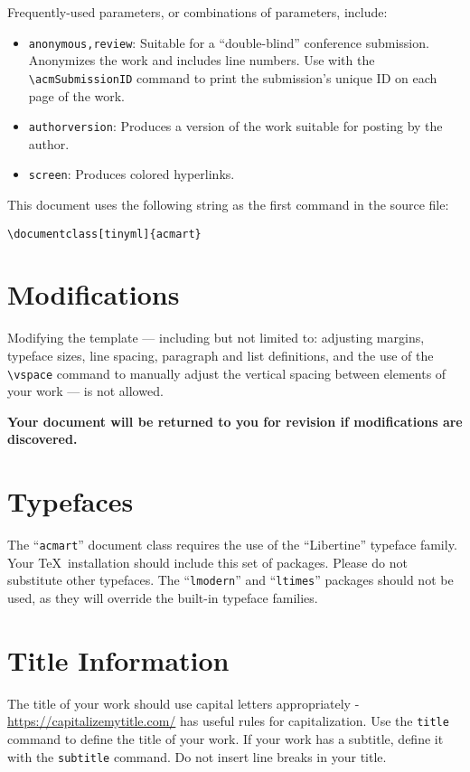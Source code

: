 \documentclass[tinyml]{acmart}
\begin{document}
Frequently-used parameters, or combinations of parameters, include:
\begin{itemize}
\item {\verb|anonymous,review|}: Suitable for a ``double-blind''
  conference submission. Anonymizes the work and includes line
  numbers. Use with the \verb|\acmSubmissionID| command to print the
  submission's unique ID on each page of the work.
\item{\verb|authorversion|}: Produces a version of the work suitable
  for posting by the author.
\item{\verb|screen|}: Produces colored hyperlinks.
\end{itemize}

This document uses the following string as the first command in the
source file:
\begin{verbatim}
\documentclass[tinyml]{acmart}
\end{verbatim}

\section{Modifications}

Modifying the template --- including but not limited to: adjusting
margins, typeface sizes, line spacing, paragraph and list definitions,
and the use of the \verb|\vspace| command to manually adjust the
vertical spacing between elements of your work --- is not allowed.

{\bfseries Your document will be returned to you for revision if
  modifications are discovered.}

\section{Typefaces}

The ``\verb|acmart|'' document class requires the use of the
``Libertine'' typeface family. Your \TeX\ installation should include
this set of packages. Please do not substitute other typefaces. The
``\verb|lmodern|'' and ``\verb|ltimes|'' packages should not be used,
as they will override the built-in typeface families.

\section{Title Information}

The title of your work should use capital letters appropriately -
\url{https://capitalizemytitle.com/} has useful rules for
capitalization. Use the {\verb|title|} command to define the title of
your work. If your work has a subtitle, define it with the
{\verb|subtitle|} command.  Do not insert line breaks in your title.
\end{document}
